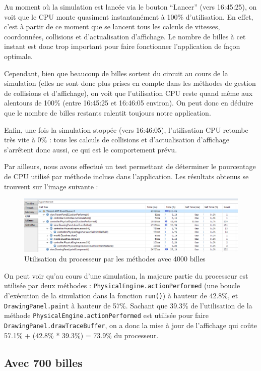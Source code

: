 \documentclass{report}
\begin{document}
Au moment où la simulation est lancée via le bouton “Lancer” (vers 16:45:25), on voit que le CPU monte quasiment instantanément à 100\% d’utilisation. En effet, c’est à partir de ce moment que se lancent tous les calculs de vitesses, coordonnées, collisions et d’actualisation d’affichage. Le nombre de billes à cet instant est donc trop important pour faire fonctionner l’application de façon optimale.

Cependant, bien que beaucoup de billes sortent du circuit au cours de la simulation (elles ne sont donc plus prises en compte dans les méthodes de gestion de collisions et d’affichage), on voit que l’utilisation CPU reste quand même aux alentours de 100\% (entre 16:45:25 et 16:46:05 environ). On peut donc en déduire que le nombre de billes restants ralentit toujours notre application.

Enfin, une fois la simulation stoppée (vers 16:46:05), l’utilisation CPU retombe très vite à 0\% : tous les calculs de collisions et d’actualisation d’affichage s’arrêtent donc aussi, ce qui est le comportement prévu.

\newpage
Par ailleurs, nous avons effectué un test permettant de déterminer le pourcentage de CPU utilisé par méthode incluse dans l’application. Les résultats obtenus se trouvent sur l’image suivante :

\begin{figure}[H]
\centering
\includegraphics[scale=0.6]{CPU.png}
\caption{Utilisation du processeur par les méthodes avec 4000 billes}
\end{figure}

On peut voir qu’au cours d’une simulation, la majeure partie du processeur est utilisée par deux méthodes : \texttt{PhysicalEngine.actionPerformed} (une boucle d’exécution de la simulation dans la fonction \texttt{run()}) à hauteur de 42.8\%, et \texttt{DrawingPanel.paint} à hauteur de 57\%. Sachant que 39.3\% de l’utilisation de la méthode \texttt{PhysicalEngine.actionPerformed} est utilisée pour faire \texttt{DrawingPanel.drawTraceBuffer}, on a donc la mise à jour de l’affichage qui coûte 57.1\% + (42.8\% * 39.3\%) = 73.9\% du processeur.


\subsection{Avec 700 billes}
\end{document}
